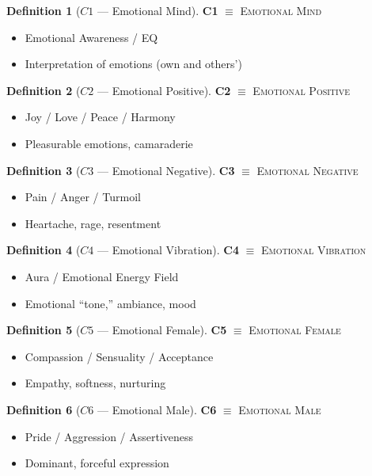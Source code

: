 \documentclass[11pt,twoside,openright]{book}
\theoremstyle{definition}
\newtheorem{definition}{Definition}[chapter]
\theoremstyle{plain}
\theoremstyle{remark}
\begin{document}
\begin{definition}[$C1$ --- Emotional Mind]
\label{def:C1}
\textbf{C1} $\equiv$ \textsc{Emotional Mind}
\begin{itemize}
  \item Emotional Awareness / EQ
  \item Interpretation of emotions (own and others')
\end{itemize}
\end{definition}

\begin{definition}[$C2$ --- Emotional Positive]
\label{def:C2}
\textbf{C2} $\equiv$ \textsc{Emotional Positive}
\begin{itemize}
  \item Joy / Love / Peace / Harmony
  \item Pleasurable emotions, camaraderie
\end{itemize}
\end{definition}

\begin{definition}[$C3$ --- Emotional Negative]
\label{def:C3}
\textbf{C3} $\equiv$ \textsc{Emotional Negative}
\begin{itemize}
  \item Pain / Anger / Turmoil
  \item Heartache, rage, resentment
\end{itemize}
\end{definition}

\begin{definition}[$C4$ --- Emotional Vibration]
\label{def:C4}
\textbf{C4} $\equiv$ \textsc{Emotional Vibration}
\begin{itemize}
  \item Aura / Emotional Energy Field
  \item Emotional ``tone,'' ambiance, mood
\end{itemize}
\end{definition}

\begin{definition}[$C5$ --- Emotional Female]
\label{def:C5}
\textbf{C5} $\equiv$ \textsc{Emotional Female}
\begin{itemize}
  \item Compassion / Sensuality / Acceptance
  \item Empathy, softness, nurturing
\end{itemize}
\end{definition}

\begin{definition}[$C6$ --- Emotional Male]
\label{def:C6}
\textbf{C6} $\equiv$ \textsc{Emotional Male}
\begin{itemize}
  \item Pride / Aggression / Assertiveness
  \item Dominant, forceful expression
\end{itemize}
\end{definition}
\end{document}

